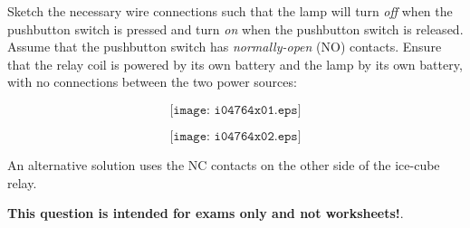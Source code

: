 

Sketch the necessary wire connections such that the lamp will turn {\it off} when the pushbutton switch is pressed and turn {\it on} when the pushbutton switch is released.  Assume that the pushbutton switch has {\it normally-open} (NO) contacts.  Ensure that the relay coil is powered by its own battery and the lamp by its own battery, with no connections between the two power sources:

$$\texttt{[image: i04764x01.eps]}$$







$$\texttt{[image: i04764x02.eps]}$$

An alternative solution uses the NC contacts on the other side of the ice-cube relay.







{\bf This question is intended for exams only and not worksheets!}.



